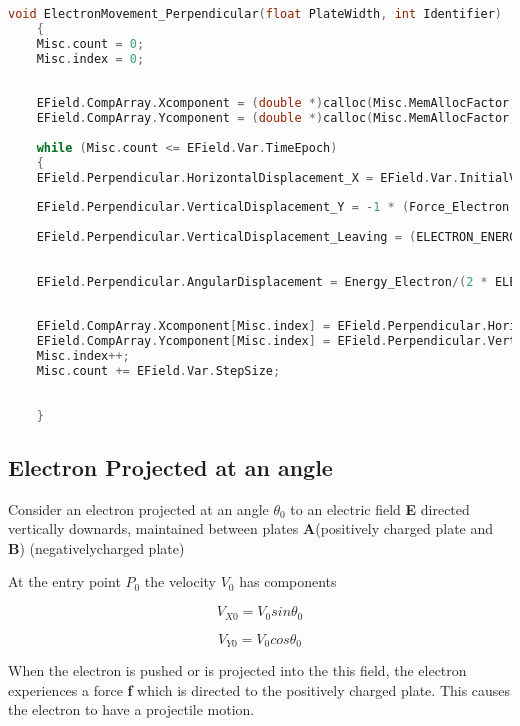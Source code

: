 \documentclass[a4paper,20pt,twoside]{report}
\begin{document}
	
	\lstset{breaklines = true}
	\begin{lstlisting}[language = C]
	void ElectronMovement_Perpendicular(float PlateWidth, int Identifier)
	{		
	Misc.count = 0;
	Misc.index = 0;
	
	
	EField.CompArray.Xcomponent = (double *)calloc(Misc.MemAllocFactor, sizeof(double));
	EField.CompArray.Ycomponent = (double *)calloc(Misc.MemAllocFactor, sizeof(double));
	
	while (Misc.count <= EField.Var.TimeEpoch)
	{
	EField.Perpendicular.HorizontalDisplacement_X = EField.Var.InitialVelocity * Misc.count;
	
	EField.Perpendicular.VerticalDisplacement_Y = -1 * (Force_Electron / 2 * ELECTRON_MASS) * pow(Misc.count,2);
	
	EField.Perpendicular.VerticalDisplacement_Leaving = (ELECTRON_ENERGY / 2 * ELECTRON_MASS) * Energy_Electron * (PlateWidth / pow(EField.Var.InitialVelocity, 2));
	
	
	EField.Perpendicular.AngularDisplacement = Energy_Electron/(2 * ELECTRON_MASS * EField.Var.InitialVelocity) * pow(EField.Perpendicular.HorizontalDisplacement_X,2);
	
	
	EField.CompArray.Xcomponent[Misc.index] = EField.Perpendicular.HorizontalDisplacement_X;
	EField.CompArray.Ycomponent[Misc.index] = EField.Perpendicular.VerticalDisplacement_Y;
	Misc.index++;
	Misc.count += EField.Var.StepSize;
	
	
	}
	\end{lstlisting}
	
	\subsection{Electron Projected at an angle}
	Consider an electron projected at an angle $\theta_0$ to an electric field \textbf{E} 
	directed vertically downards, maintained between plates 
	\textbf{A}(positively charged plate and \textbf{B}) (negativelycharged plate)
		
		At the entry point $P_0$ the velocity $V_0$ has components 
		
		\begin{equation}
		V_{X0} = V_0 sin\theta_0 %
		\end{equation}
		
		\begin{equation}
		V_{Y0} = V_0 cos\theta_0
		\end{equation}
	
	
	When the electron is pushed or is projected into the this field, the electron experiences 
	a force \textbf{f} which is directed to the positively charged plate. This causes the electron
	to have a projectile motion.\\
	
\end{document}
